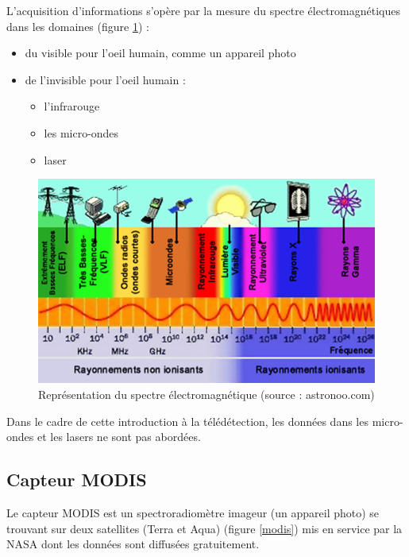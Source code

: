 \documentclass[10pt,a4paper]{article}
\begin{document}
L'acquisition d'informations s'opère par la mesure du spectre électromagnétiques dans les domaines (figure \ref{spectreElectro}) :

\begin{itemize}
\item du visible pour l'oeil humain, comme un appareil photo
\item de l'invisible pour l'oeil humain :
\begin{itemize}
\item l'infrarouge
\item les micro-ondes
\item laser
\end{itemize}
\end{itemize}

\begin{figure}[!h]
\centering
\includegraphics[scale=0.55]{img/spectre-electromagnetique.png}
\caption{Représentation du spectre électromagnétique (source : astronoo.com)}
\label{spectreElectro}
\end{figure}

Dans le cadre de cette introduction à la télédétection, les données dans les micro-ondes et les lasers ne sont pas abordées.

\subsection{Capteur MODIS}

Le capteur MODIS est un spectroradiomètre imageur (un appareil photo) se trouvant sur deux satellites (Terra et Aqua) (figure \ref{modis}) mis en service par la NASA dont les données sont diffusées gratuitement.
\end{document}
